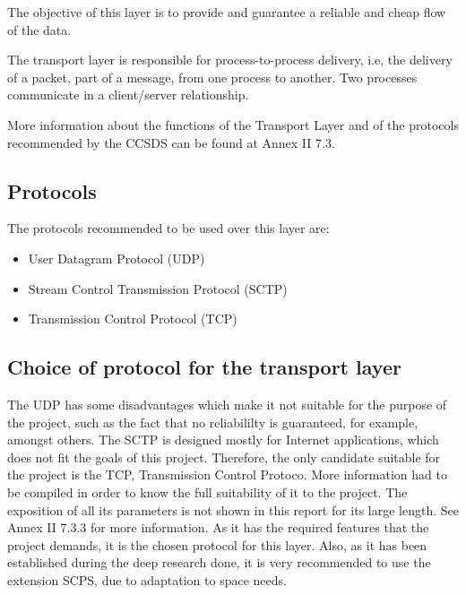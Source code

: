 %
%
%
%
%



The objective of this layer is to provide and guarantee a reliable and cheap flow of the data. 

The transport layer is responsible for process-to-process delivery, i.e, the delivery of a packet, part of a message, from one process to another. Two processes communicate in a client/server relationship. 

More information about the functions of the Transport Layer and of the protocols recommended by the CCSDS can be found at Annex II 7.3.
\subsection{Protocols}
The protocols recommended to be used over this layer are:
\begin{itemize}
\item User Datagram Protocol (UDP)
\item Stream Control Transmission Protocol (SCTP)
\item Transmission Control Protocol (TCP)
\end{itemize}
\subsection{Choice of protocol for the transport layer}
The UDP has some disadvantages which make it not suitable for the purpose of the project, such as the fact that no reliabililty is guaranteed, for example, amongst others. The SCTP is designed mostly for Internet applications, which does not fit the goals of this project. Therefore, the only candidate suitable for the project is the TCP, Transmission Control Protoco. More information had to be compiled in order to know the full suitability of it to the project. The exposition of all its parameters is not shown in this report for its large length. See Annex II 7.3.3 for more information.  As it has the required features that the project demands, it is the chosen protocol for this layer. Also, as it has been established during the deep research done, it is very recommended to use the extension SCPS, due to adaptation to space needs.  

%
